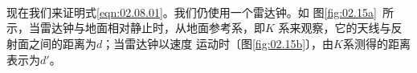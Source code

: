 \begin{figurex}[!b]
    \centering
     \\ \vspace{-0.3em}
     \\ \vspace{-0.3em}
     \\ \vspace{-0.3em}
    \caption{}
    \label{fig:02.15}
\end{figurex}
现在我们来证明式\eqref{eqn:02.08.01}。我们仍使用一个雷达钟。如
图\ref{fig:02.15a}~所示，当雷达钟与地面相对静止时，从地面参考系，即$K$
系来观察，它的天线与反射面之间的距离为$ d$；当雷达钟以速度
运动时〔图\ref{fig:02.15b}〕，由$K$系测得的距离表示为$d'$。

